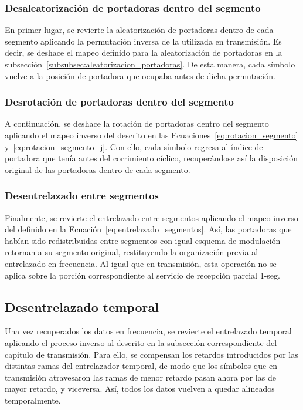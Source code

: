 \subsubsection{Desaleatorización de portadoras dentro del segmento}

En primer lugar, se revierte la aleatorización de portadoras dentro de cada segmento aplicando la permutación inversa de la utilizada en transmisión. Es decir, se deshace el mapeo definido para la aleatorización de portadoras en la subsección~\ref{subsubsec:aleatorizacion_portadoras}. De esta manera, cada símbolo vuelve a la posición de portadora que ocupaba antes de dicha permutación.

\subsubsection{Desrotación de portadoras dentro del segmento}

A continuación, se deshace la rotación de portadoras dentro del segmento aplicando el mapeo inverso del descrito en las Ecuaciones~\eqref{eq:rotacion_segmento} y~\eqref{eq:rotacion_segmento_j}. Con ello, cada símbolo regresa al índice de portadora que tenía antes del corrimiento cíclico, recuperándose así la disposición original de las portadoras dentro de cada segmento.

\subsubsection{Desentrelazado entre segmentos}

Finalmente, se revierte el entrelazado entre segmentos aplicando el mapeo inverso del definido en la Ecuación~\eqref{eq:entrelazado_segmentos}. Así, las portadoras que habían sido redistribuidas entre segmentos con igual esquema de modulación retornan a su segmento original, restituyendo la organización previa al entrelazado en frecuencia. Al igual que en transmisión, esta operación no se aplica sobre la porción correspondiente al servicio de recepción parcial 1-seg.

\subsection{Desentrelazado temporal}

Una vez recuperados los datos en frecuencia, se revierte el entrelazado temporal aplicando el proceso inverso al descrito en la subsección correspondiente del capítulo de transmisión. Para ello, se compensan los retardos introducidos por las distintas ramas del entrelazador temporal, de modo que los símbolos que en transmisión atravesaron las ramas de menor retardo pasan ahora por las de mayor retardo, y viceversa. Así, todos los datos vuelven a quedar alineados temporalmente.

